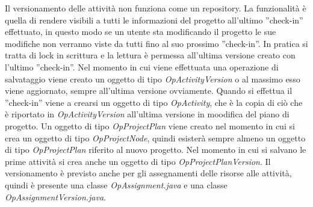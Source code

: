 Il versionamento delle attivit\`{a} non funziona come un repository. La funzionalit\`{a} \`{e} quella di rendere visibili a tutti le informazioni del progetto all\textquoteright{}ultimo ''check-in'' effettuato, in questo modo se un utente sta modificando il progetto le sue modifiche non verranno viste da tutti fino al suo prossimo ''check-in''. In pratica si tratta di lock in scrittura e la lettura \`{e} permessa all\textquoteright{}ultima versione creato con l\textquoteright{}ultimo ''check-in''.
Nel momento in cui viene effettuata una operazione di salvataggio viene creato un oggetto di tipo \textit{OpActivityVersion} o al massimo esso viene aggiornato, sempre all\textquoteright{}ultima versione ovviamente. Quando si effettua il ''check-in'' viene a crearsi un oggetto di tipo \textit{OpActivity}, che \`{e} la copia di ci\`{o} che \`{e} riportato in \textit{OpActivityVersion} all\textquoteright{}ultima versione in moodifica del piano di progetto.
Un oggetto di tipo \textit{OpProjectPlan} viene creato nel momento in cui si crea un oggetto di tipo \textit{OpProjectNode}, quindi esister\`{a} sempre almeno un oggetto di tipo \textit{OpProjectPlan} riferito al nuovo progetto. Nel momento in cui si salvano le prime attivit\`{a} si crea anche un oggetto di tipo \textit{OpProjectPlanVersion}. Il versionamento \`{e} previsto anche per gli assegnamenti delle risorse alle attivit\`{a}, quindi \`{e} presente una classe \textit{OpAssignment.java} e una classe \textit{OpAssignmentVersion.java}.\\
